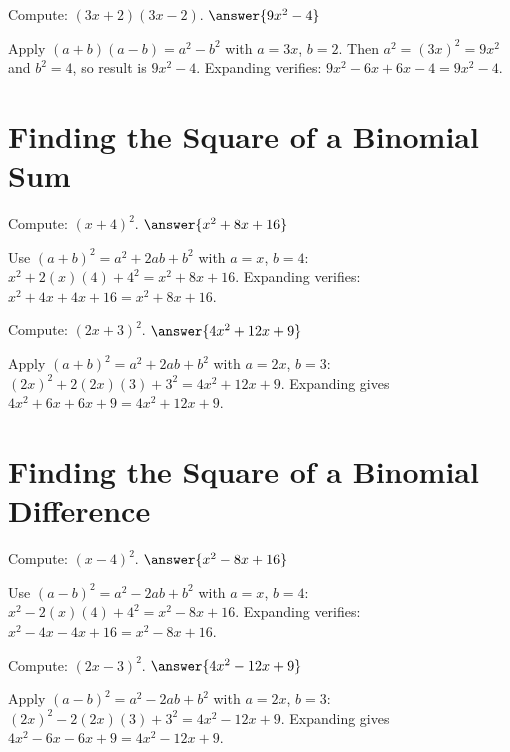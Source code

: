 \documentclass{ximera}
\begin{document}
\begin{problem}
Compute: \((3x + 2)(3x - 2)\). $\answer{9x^2 - 4}$
\begin{feedback}
Apply \((a+b)(a-b)=a^2-b^2\) with \(a=3x\), \(b=2\). Then \(a^2=(3x)^2=9x^2\) and \(b^2=4\), so result is \(9x^2-4\). Expanding verifies: \(9x^2-6x+6x-4=9x^2-4\).
\end{feedback}
\end{problem}

\section*{Finding the Square of a Binomial Sum}

\begin{problem}
Compute: \((x + 4)^2\). $\answer{x^2 + 8x + 16}$
\begin{feedback}
Use \((a+b)^2 = a^2 + 2ab + b^2\) with \(a=x\), \(b=4\): \(x^2 + 2(x)(4) + 4^2 = x^2 + 8x + 16\). Expanding verifies: \(x^2+4x+4x+16 = x^2+8x+16\).
\end{feedback}
\end{problem}

\begin{problem}
Compute: \((2x + 3)^2\). $\answer{4x^2 + 12x + 9}$
\begin{feedback}
Apply \((a+b)^2 = a^2 + 2ab + b^2\) with \(a=2x\), \(b=3\): \((2x)^2 + 2(2x)(3) + 3^2 = 4x^2 + 12x + 9\). Expanding gives \(4x^2+6x+6x+9 = 4x^2+12x+9\).
\end{feedback}
\end{problem}



\section*{Finding the Square of a Binomial Difference}

\begin{problem}
Compute: \((x - 4)^2\). $\answer{x^2 - 8x + 16}$
\begin{feedback}
Use \((a-b)^2 = a^2 - 2ab + b^2\) with \(a=x\), \(b=4\): \(x^2 - 2(x)(4) + 4^2 = x^2 - 8x + 16\). Expanding verifies: \(x^2-4x-4x+16 = x^2 - 8x + 16\).
\end{feedback}
\end{problem}

\begin{problem}
Compute: \((2x - 3)^2\). $\answer{4x^2 - 12x + 9}$
\begin{feedback}
Apply \((a-b)^2 = a^2 - 2ab + b^2\) with \(a=2x\), \(b=3\): \((2x)^2 - 2(2x)(3) + 3^2 = 4x^2 - 12x + 9\). Expanding gives \(4x^2-6x-6x+9 = 4x^2 - 12x + 9\).
\end{feedback}
\end{problem}

\end{document}
